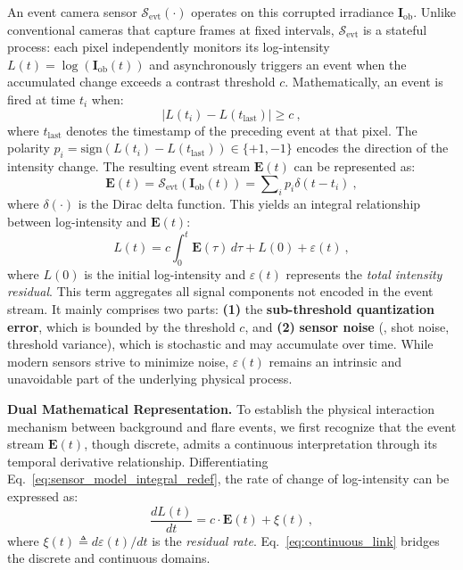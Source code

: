 An event camera sensor $\mathcal{S}_{\mathrm{evt}}(\cdot)$ operates on this corrupted irradiance $\mathbf{I}_{\mathrm{ob}}$. Unlike conventional cameras that capture frames at fixed intervals, $\mathcal{S}_{\mathrm{evt}}$ is a stateful process: each pixel independently monitors its log-intensity $L(t) = \log(\mathbf{I}_{\mathrm{ob}}(t))$ and asynchronously triggers an event when the accumulated change exceeds a contrast threshold $c$. Mathematically, an event is fired at time $t_i$ when:
\begin{equation}
    |L(t_i) - L(t_{\mathrm{last}})| \ge c~,
    \label{eq:event_threshold_condition}
\end{equation}
where $t_{\mathrm{last}}$ denotes the timestamp of the preceding event at that pixel. The polarity $p_i = \mathrm{sign}(L(t_i) - L(t_{\mathrm{last}})) \in \{+1, -1\}$ encodes the direction of the intensity change. The resulting event stream $\mathbf{E}(t)$ can be represented as:
\begin{equation}
    \mathbf{E}(t) = \mathcal{S}_{\mathrm{evt}}(\mathbf{I}_{\mathrm{ob}}(t)) = \sum\nolimits_{i} p_i \delta(t - t_i)~,
    \label{eq:event_stream_definition}
\end{equation}
where $\delta(\cdot)$ is the Dirac delta function. This yields an integral relationship between log-intensity and $\mathbf{E}(t)$:
\begin{equation}
    L(t) = c \int_{0}^{t} \mathbf{E}(\tau) \, d\tau + L(0) + \varepsilon(t)~,
    \label{eq:sensor_model_integral_redef}
\end{equation}
where $L(0)$ is the initial log-intensity and $\varepsilon(t)$ represents the \emph{total intensity residual}. This term aggregates all signal components not encoded in the event stream. It mainly comprises two parts: \textbf{(1)} the \textbf{sub-threshold quantization error}, which is bounded by the threshold $c$, and \textbf{(2)} \textbf{sensor noise} (\eg, shot noise, threshold variance), which is stochastic and may accumulate over time. While modern sensors strive to minimize noise, $\varepsilon(t)$ remains an intrinsic and unavoidable part of the underlying physical process.

\textbf{Dual Mathematical Representation.} To establish the physical interaction mechanism between background and flare events, we first recognize that the event stream $\mathbf{E}(t)$, though discrete, admits a continuous interpretation through its temporal derivative relationship. Differentiating Eq.~\ref{eq:sensor_model_integral_redef}, the rate of change of log-intensity can be expressed as:
\begin{equation}
    \frac{dL(t)}{dt} = c \cdot \mathbf{E}(t) + \xi(t)~,
    \label{eq:continuous_link}
\end{equation}
where $\xi(t) \triangleq d\varepsilon(t)/dt$ is the \emph{residual rate}. Eq.~\ref{eq:continuous_link} bridges the discrete and continuous domains.


